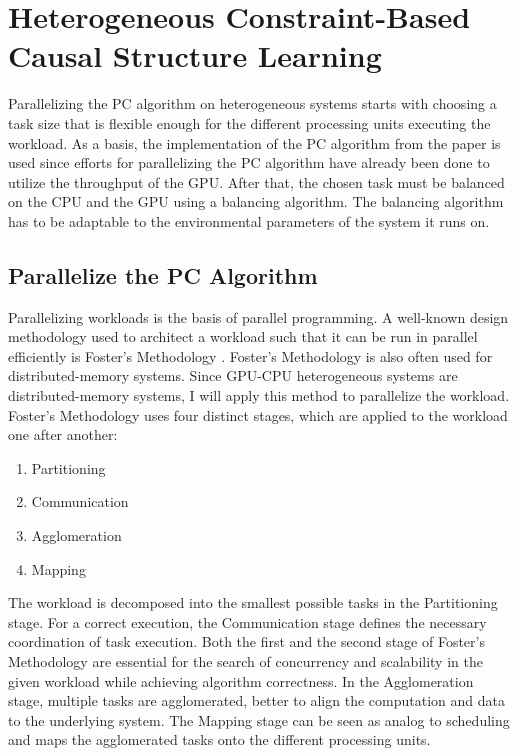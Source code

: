 \chapter{Heterogeneous Constraint-Based Causal Structure Learning}
Parallelizing the PC algorithm on heterogeneous systems starts with choosing a task size that is flexible enough for the different processing units executing the workload. As a basis, the implementation of the PC algorithm from the paper \cite{schmidtOrderIndependentConstraintBasedCausal2018} is used since efforts for parallelizing the PC algorithm have already been done to utilize the throughput of the GPU. After that, the chosen task must be balanced on the CPU and the GPU using a balancing algorithm. The balancing algorithm has to be adaptable to the environmental parameters of the system it runs on.

\section{Parallelize the PC Algorithm}
Parallelizing workloads is the basis of parallel programming. A well-known design methodology used to architect a workload such that it can be run in parallel efficiently is Foster's Methodology \cite{fosterDesigningBuildingParallel1995}. Foster's Methodology is also often used for distributed-memory systems. Since GPU-CPU heterogeneous systems are distributed-memory systems, I will apply this method to parallelize the workload. Foster's Methodology uses four distinct stages, which are applied to the workload one after another:

\begin{enumerate}
    \item Partitioning
    \item Communication
    \item Agglomeration 
    \item Mapping
\end{enumerate}

The workload is decomposed into the smallest possible tasks in the Partitioning stage. For a correct execution, the Communication stage defines the necessary coordination of task execution. Both the first and the second stage of Foster's Methodology are essential for the search of concurrency and scalability in the given workload while achieving algorithm correctness. In the Agglomeration stage, multiple tasks are agglomerated, better to align the computation and data to the underlying system. The Mapping stage can be seen as analog to scheduling and maps the agglomerated tasks onto the different processing units.

